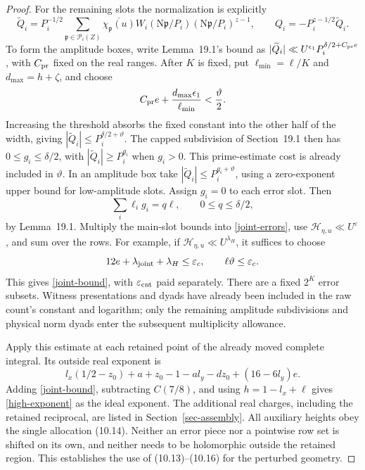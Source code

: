 \documentclass[10pt,reqno,a4paper]{amsart}
\theoremstyle{remark}
\newcommand{\N}{\mathrm N}
\newcommand{\eps}{\varepsilon}
\newcommand{\pp}{\mathfrak p}
\begin{document}
\begin{proof}
For the remaining slots the normalization is explicitly
\[
 \widetilde Q_i=P_i^{-1/2}
   \sum_{\pp\in\mathcal P_i(Z)}
       \overline{\chi_\pp(u)}W_i(\N\pp/P_i)
                          (\N\pp/P_i)^{z-1},
 \qquad Q_i=-P_i^{z-1/2}\widetilde Q_i.
\]
To form the amplitude boxes, write Lemma~19.1's bound as
$|\widetilde Q_i|\ll U^{\epsilon_1}P_i^{\delta/2+C_{\rm pr}e}$,
with $C_{\rm pr}$ fixed on the real ranges. After $K$ is fixed, put
$\ell_{\min}=\ell/K$ and $d_{\max}=h+\zeta$, and choose
\[
 C_{\rm pr}e+\frac{d_{\max}\epsilon_1}{\ell_{\min}}
                                             <\frac\vartheta2.
\]
Increasing the threshold absorbs the fixed constant into the other
half of the width, giving $|\widetilde Q_i|\le P_i^{\delta/2+\vartheta}$.
The capped subdivision of Section~19.1 then has
$0\le g_i\le\delta/2$, with $|\widetilde Q_i|\ge P_i^{g_i}$
when $g_i>0$. This prime-estimate cost is already included in
$\vartheta$. In an amplitude box take
$|\widetilde Q_i|\le P_i^{g_i+\vartheta}$,
using a zero-exponent upper bound for low-amplitude slots. Assign
$g_i=0$ to each error slot. Then
\[
                       \sum_i\ell_i g_i=q\ell,
                       \qquad 0\le q\le\delta/2,
\]
by Lemma~19.1. Multiply the main-slot bounds into
\eqref{joint-errors}, use $\mathscr H_{\eta,u}\ll U^\eps$, and sum
over the rows. For example, if
$\mathscr H_{\eta,u}\ll U^{\lambda_H}$, it suffices to choose
\[
 12e+\lambda_{\rm joint}+\lambda_H\le\eps_c,
                       \qquad \ell\vartheta\le\eps_c.
\]
This gives \eqref{joint-bound}, with $\eps_{\rm cnt}$ paid separately.
There are a fixed $2^K$ error subsets. Witness presentations and dyads
have already been included in the raw count's constant and logarithm;
only the remaining amplitude subdivisions and physical norm dyads
enter the subsequent multiplicity allowance.

Apply this estimate at each retained point of the already moved
complete integral. Its outside real exponent is
\[
 l_x(1/2-z_0)+a+z_0-1-al_y-dz_0+(16-6l_y)e.
\]
Adding \eqref{joint-bound}, subtracting $C(7/8)$, and using
$h=1-l_x+\ell$ gives \eqref{high-exponent} as the ideal exponent.
The additional real charges, including the retained reciprocal, are
listed in Section~\ref{sec-assembly}. All auxiliary heights obey the
single allocation (10.14). Neither an error piece
nor a pointwise row set is shifted on its own, and neither needs to
be holomorphic outside the retained region. This establishes the
use of (10.13)--(10.16) for the perturbed geometry.
\end{proof}
\end{document}
